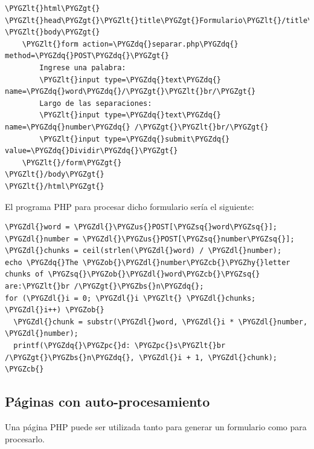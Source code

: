 \documentclass[a5paper,10pt,spanish]{sphinxmanual}
\def\PYGZbs{\char`\\}
\def\PYGZus{\char`\_}
\def\PYGZob{\char`\{}
\def\PYGZcb{\char`\}}
\def\PYGZlt{\char`\<}
\def\PYGZgt{\char`\>}
\def\PYGZpc{\char`\%}
\def\PYGZdl{\char`\$}
\def\PYGZhy{\char`\-}
\def\PYGZsq{\char`\'}
\def\PYGZdq{\char`\"}
\begin{document}
\begin{Verbatim}[commandchars=\\\{\}]
\PYGZlt{}html\PYGZgt{}
\PYGZlt{}head\PYGZgt{}\PYGZlt{}title\PYGZgt{}Formulario\PYGZlt{}/title\PYGZgt{}\PYGZlt{}/head\PYGZgt{}
\PYGZlt{}body\PYGZgt{}
    \PYGZlt{}form action=\PYGZdq{}separar.php\PYGZdq{} method=\PYGZdq{}POST\PYGZdq{}\PYGZgt{}
        Ingrese una palabra:
        \PYGZlt{}input type=\PYGZdq{}text\PYGZdq{} name=\PYGZdq{}word\PYGZdq{}/\PYGZgt{}\PYGZlt{}br/\PYGZgt{}
        Largo de las separaciones:
        \PYGZlt{}input type=\PYGZdq{}text\PYGZdq{} name=\PYGZdq{}number\PYGZdq{} /\PYGZgt{}\PYGZlt{}br/\PYGZgt{}
        \PYGZlt{}input type=\PYGZdq{}submit\PYGZdq{} value=\PYGZdq{}Dividir\PYGZdq{}\PYGZgt{}
    \PYGZlt{}/form\PYGZgt{}
\PYGZlt{}/body\PYGZgt{}
\PYGZlt{}/html\PYGZgt{}
\end{Verbatim}

El programa PHP para procesar dicho formulario sería el siguiente:

\begin{Verbatim}[commandchars=\\\{\}]
\PYGZdl{}word = \PYGZdl{}\PYGZus{}POST[\PYGZsq{}word\PYGZsq{}];
\PYGZdl{}number = \PYGZdl{}\PYGZus{}POST[\PYGZsq{}number\PYGZsq{}];
\PYGZdl{}chunks = ceil(strlen(\PYGZdl{}word) / \PYGZdl{}number);
echo \PYGZdq{}The \PYGZob{}\PYGZdl{}number\PYGZcb{}\PYGZhy{}letter chunks of \PYGZsq{}\PYGZob{}\PYGZdl{}word\PYGZcb{}\PYGZsq{} are:\PYGZlt{}br /\PYGZgt{}\PYGZbs{}n\PYGZdq{};
for (\PYGZdl{}i = 0; \PYGZdl{}i \PYGZlt{} \PYGZdl{}chunks; \PYGZdl{}i++) \PYGZob{}
  \PYGZdl{}chunk = substr(\PYGZdl{}word, \PYGZdl{}i * \PYGZdl{}number, \PYGZdl{}number);
  printf(\PYGZdq{}\PYGZpc{}d: \PYGZpc{}s\PYGZlt{}br /\PYGZgt{}\PYGZbs{}n\PYGZdq{}, \PYGZdl{}i + 1, \PYGZdl{}chunk);
\PYGZcb{}
\end{Verbatim}


\subsection{Páginas con auto-procesamiento}
\label{Tutorial2_Formularios.md:paginas-con-auto-procesamiento}
Una página PHP puede ser utilizada tanto para generar un formulario como
para procesarlo.
\end{document}
